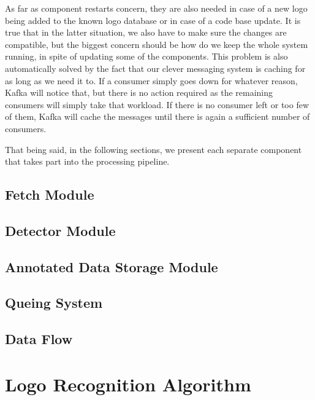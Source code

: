 As far as component restarts concern, they are also needed in case of a new
logo being added to the known logo database or in case of a code base update.
It is true that in the latter situation, we also have to make sure the changes
are compatible, but the biggest concern should be how do we keep the whole
system running, in spite of updating some of the components. This problem is
also automatically solved by the fact that our clever messaging system is
caching for as long as we need it to. If a consumer simply goes down for
whatever reason, Kafka will notice that, but there is no action required as
the remaining consumers will simply take that workload. If there is no
consumer left or too few of them, Kafka will cache the messages until there
is again a sufficient number of consumers.

That being said, in the following sections, we present each separate component that takes part
into the processing pipeline.

\subsection{Fetch Module}
\label{sub-sec:fetch-module}


\subsection{Detector Module}

\subsection{Annotated Data Storage Module}
\label{sub-sec:ads-module}
\subsection{Queing System}

\subsection{Data Flow}

\section{Logo Recognition Algorithm}
\label{sec:logo-alg}
